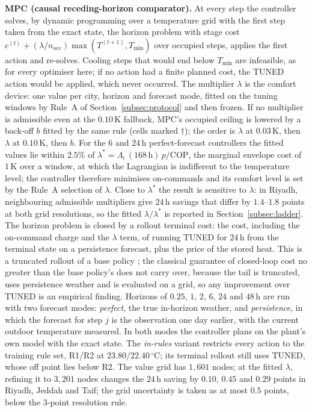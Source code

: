 \documentclass[pdflatex,sn-mathphys-num,iicol]{sn-jnl}
\theoremstyle{thmstyleone}\newtheorem{proposition}{Proposition}\newtheorem{corollary}{Corollary}
\theoremstyle{thmstyletwo}\newtheorem{remark}{Remark}\newtheorem{observation}{Observation}
\theoremstyle{thmstylethree}\newtheorem{definition}{Definition}
\newcommand{\Tmin}{T_{\min}}
\begin{document}
\textbf{MPC (causal receding-horizon comparator).} At every step the controller solves, by dynamic programming over a temperature grid with the first step taken from the exact state, the horizon problem with stage cost $c^{(t)}+(\lambda/n_{\mathrm{occ}})\max(T^{(t+1)},\Tmin)$ over occupied steps, applies the first action and re-solves. Cooling steps that would end below $\Tmin$ are infeasible, as for every optimiser here; if no action had a finite planned cost, the TUNED action would be applied, which never occurred. The multiplier $\lambda$ is the comfort device: one value per city, horizon and forecast mode, fitted on the tuning windows by Rule~A of Section~\ref{subsec:protocol} and then frozen. If no multiplier is admissible even at the $0.10\,$K fallback, MPC's occupied ceiling is lowered by a back-off $b$ fitted by the same rule (cells marked $\dagger$); the order is $\lambda$ at $0.03\,$K, then $\lambda$ at $0.10\,$K, then $b$. For the $6$ and $24\,$h perfect-forecast controllers the fitted values lie within $2.5\%$ of $\lambda^\ast=\Lambda_i\,(168\,\mathrm{h})\,p/\mathrm{COP}$, the marginal envelope cost of $1\,$K over a window, at which the Lagrangian is indifferent to the temperature level; the controller therefore minimises on-commands and its comfort level is set by the Rule~A selection of $\lambda$. Close to $\lambda^\ast$ the result is sensitive to $\lambda$: in Riyadh, neighbouring admissible multipliers give $24\,$h savings that differ by $1.4$--$1.8$ points at both grid resolutions, so the fitted $\lambda/\lambda^\ast$ is reported in Section~\ref{subsec:ladder}. The horizon problem is closed by a rollout terminal cost: the cost, including the on-command charge and the $\lambda$ term, of running TUNED for $24\,$h from the terminal state on a persistence forecast, plus the price of the stored heat. This is a truncated rollout of a base policy \citep{Bertsekas2020}; the classical guarantee of closed-loop cost no greater than the base policy's does not carry over, because the tail is truncated, uses persistence weather and is evaluated on a grid, so any improvement over TUNED is an empirical finding. Horizons of $0.25$, $1$, $2$, $6$, $24$ and $48\,$h are run with two forecast modes: \emph{perfect}, the true in-horizon weather, and \emph{persistence}, in which the forecast for step $j$ is the observation one day earlier, with the current outdoor temperature measured. In both modes the controller plans on the plant's own model with the exact state. The \emph{in-rules} variant restricts every action to the training rule set, R1/R2 at $23.80/22.40\,^\circ$C; its terminal rollout still uses TUNED, whose off point lies below R2. The value grid has $1{,}601$ nodes; at the fitted $\lambda$, refining it to $3{,}201$ nodes changes the $24\,$h saving by $0.10$, $0.45$ and $0.29$ points in Riyadh, Jeddah and Taif; the grid uncertainty is taken as at most $0.5$ points, below the $3$-point resolution rule.
\end{document}
